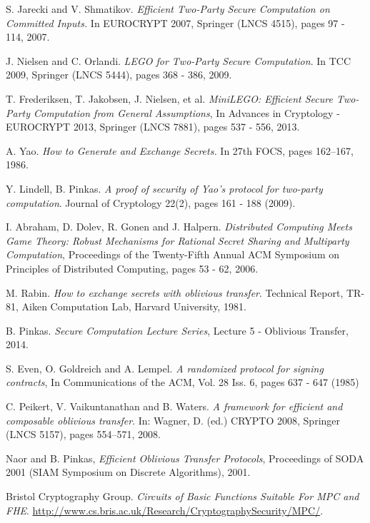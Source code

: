 \documentclass[ %
                    author={Nicholas Tutte},
                supervisor={Prof. Nigel Smart},
                    degree={MEng},
                     title={Secure Two Party Computation},
                  subtitle={A practical comparison of recent protocols},
                      type={Research - GG1K},
                      year={2015} ]{dissertation}
\begin{document}
\begin{thebibliography}{99}
			S. Jarecki and V. Shmatikov.
			\emph{Efficient Two-Party Secure Computation on Committed Inputs.}
			In EUROCRYPT 2007, Springer (LNCS 4515),
			pages 97 - 114,
			2007.

			J. Nielsen and C. Orlandi. \emph{LEGO for Two-Party Secure Computation}. In TCC 2009, Springer (LNCS 5444), pages 368 - 386, 2009.

			T. Frederiksen, T. Jakobsen, J. Nielsen, et al. \emph{MiniLEGO: Efficient Secure Two-Party Computation from General Assumptions}, In Advances in Cryptology - EUROCRYPT 2013, Springer (LNCS 7881), pages 537 - 556, 2013.

			A. Yao. \emph{How to Generate and Exchange Secrets.} In 27th FOCS, pages 162–167, 1986.

			Y. Lindell, B. Pinkas. \emph{A proof of security of Yao’s protocol for two-party computation}. Journal of Cryptology 22(2), pages 161 - 188 (2009).

			I. Abraham, D. Dolev, R. Gonen and J. Halpern. \emph{Distributed Computing Meets Game Theory: Robust Mechanisms for Rational Secret Sharing and Multiparty Computation}, Proceedings of the Twenty-Fifth Annual ACM Symposium on Principles of Distributed Computing,  pages 53 - 62, 2006.

			M. Rabin. \emph{How to exchange secrets with oblivious transfer}. Technical Report, TR-81, Aiken Computation Lab, Harvard University, 1981.

			B. Pinkas. \emph{Secure Computation Lecture Series}, Lecture 5 - Oblivious Transfer, 2014.

			S. Even, O. Goldreich and A. Lempel. \emph{A randomized protocol for signing contracts}, In Communications of the ACM, Vol. 28 Iss. 6, pages 637 - 647 (1985)

			C. Peikert, V. Vaikuntanathan and B. Waters. \emph{A framework for efficient and composable oblivious transfer}. In: Wagner, D. (ed.) CRYPTO 2008, Springer (LNCS 5157), pages 554–571, 2008.

			Naor and B. Pinkas, \emph{Efficient Oblivious Transfer Protocols}, Proceedings of SODA 2001 (SIAM Symposium on Discrete Algorithms), 2001.

			Bristol Cryptography Group. \emph{Circuits of Basic Functions Suitable For MPC and FHE}.  \url{http://www.cs.bris.ac.uk/Research/CryptographySecurity/MPC/}. 


\end{thebibliography}
\end{document}
